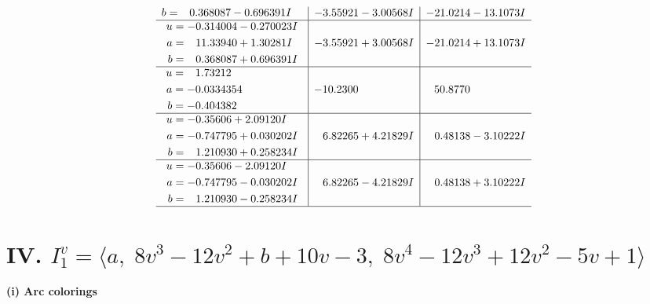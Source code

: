 \documentclass[1p]{elsarticle_modified}
\theoremstyle{definition}
\begin{document}
$$\begin{array}{c|c|c}
\begin{aligned}
b &= \phantom{-}0.368087 - 0.696391 I\end{aligned}
 & -3.55921 - 3.00568 I & -21.0214 - 13.1073 I \\ \hline\begin{aligned}
u &= -0.314004 - 0.270023 I \\
a &= \phantom{-}11.33940 + 1.30281 I \\
b &= \phantom{-}0.368087 + 0.696391 I\end{aligned}
 & -3.55921 + 3.00568 I & -21.0214 + 13.1073 I \\ \hline\begin{aligned}
u &= \phantom{-}1.73212\phantom{ +0.000000I} \\
a &= -0.0334354\phantom{ +0.000000I} \\
b &= -0.404382\phantom{ +0.000000I}\end{aligned}
 & -10.2300\phantom{ +0.000000I} & \phantom{-}50.8770\phantom{ +0.000000I} \\ \hline\begin{aligned}
u &= -0.35606 + 2.09120 I \\
a &= -0.747795 + 0.030202 I \\
b &= \phantom{-}1.210930 + 0.258234 I\end{aligned}
 & \phantom{-}6.82265 + 4.21829 I & \phantom{-}0.48138 - 3.10222 I \\ \hline\begin{aligned}
u &= -0.35606 - 2.09120 I \\
a &= -0.747795 - 0.030202 I \\
b &= \phantom{-}1.210930 - 0.258234 I\end{aligned}
 & \phantom{-}6.82265 - 4.21829 I & \phantom{-}0.48138 + 3.10222 I\\
 \hline 
 \end{array}$$\newpage\newpage\renewcommand{\arraystretch}{1}
\centering \section*{IV. $I^v_{1}= \langle a,\;8 v^3-12 v^2+b+10 v-3,\;8 v^4-12 v^3+12 v^2-5 v+1 \rangle$}
\flushleft \textbf{(i) Arc colorings}\\
\end{document}
